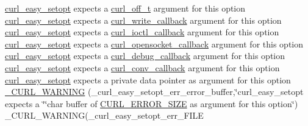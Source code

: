 \begin{DoxyCompactItemize}
\hyperlink{easy_8h_a7b171739b7bb728b3b58b2e6ec454aa0}{curl\+\_\+easy\+\_\+setopt} expects a \hyperlink{curlbuild_8h_a494e2b4279dc064f7ed1d0abd602b28d}{curl\+\_\+off\+\_\+t} argument for this option \hyperlink{easy_8h_a7b171739b7bb728b3b58b2e6ec454aa0}{curl\+\_\+easy\+\_\+setopt} expects a \hyperlink{curl_8h_ad65e62dcde45b356254b0f25f38dd802}{curl\+\_\+write\+\_\+callback} argument for this option \hyperlink{easy_8h_a7b171739b7bb728b3b58b2e6ec454aa0}{curl\+\_\+easy\+\_\+setopt} expects a \hyperlink{curl_8h_ae0524f6ec082005e39eb275c71c59a3b}{curl\+\_\+ioctl\+\_\+callback} argument for this option \hyperlink{easy_8h_a7b171739b7bb728b3b58b2e6ec454aa0}{curl\+\_\+easy\+\_\+setopt} expects a \hyperlink{curl_8h_a1b8b8f3e1a4e538a6bb1dd83a3388547}{curl\+\_\+opensocket\+\_\+callback} argument for this option \hyperlink{easy_8h_a7b171739b7bb728b3b58b2e6ec454aa0}{curl\+\_\+easy\+\_\+setopt} expects a \hyperlink{curl_8h_a50147c55283ee1fa3322b0d5aff2326c}{curl\+\_\+debug\+\_\+callback} argument for this option \hyperlink{easy_8h_a7b171739b7bb728b3b58b2e6ec454aa0}{curl\+\_\+easy\+\_\+setopt} expects a \hyperlink{curl_8h_acb230bf6dbf7bcb6e4e8740ea42ca3b3}{curl\+\_\+conv\+\_\+callback} argument for this option \hyperlink{easy_8h_a7b171739b7bb728b3b58b2e6ec454aa0}{curl\+\_\+easy\+\_\+setopt} expects a private data pointer as argument for this option \hyperlink{typecheck-gcc_8h_ae22d9c1d32c707914f070e1701b818b9}{\+\_\+\+C\+U\+R\+L\+\_\+\+W\+A\+R\+N\+I\+NG} (\+\_\+curl\+\_\+easy\+\_\+setopt\+\_\+err\+\_\+error\+\_\+buffer,\char`\"{}curl\+\_\+easy\+\_\+setopt expects a \char`\"{}\char`\"{}char buffer of \hyperlink{curl_8h_a9b030d9fa7b7487eb12d53c6188a2bde}{C\+U\+R\+L\+\_\+\+E\+R\+R\+O\+R\+\_\+\+S\+I\+ZE} as argument for this option\char`\"{}) \+\_\+\+C\+U\+R\+L\+\_\+\+W\+A\+R\+N\+I\+NG(\+\_\+curl\+\_\+easy\+\_\+setopt\+\_\+err\+\_\+\+F\+I\+LE
\item 

\end{DoxyCompactItemize}
